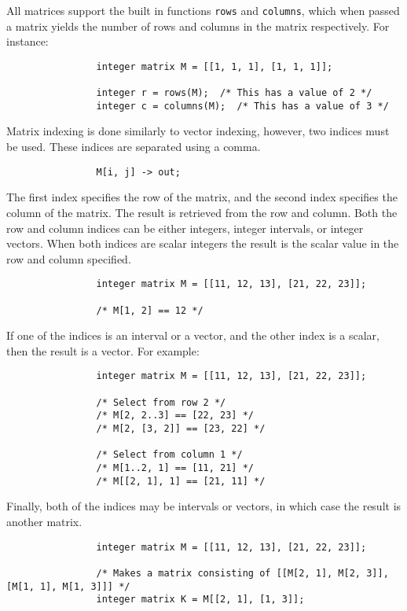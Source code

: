 \documentclass[../../gazprea.tex]{subfiles}
\begin{document}
			All matrices support the built in functions \texttt{rows} and \texttt{columns}, which when passed a matrix
			yields the number of rows and columns in the matrix respectively. For instance:

			\begin{lstlisting}
				integer matrix M = [[1, 1, 1], [1, 1, 1]];

				integer r = rows(M);  /* This has a value of 2 */
				integer c = columns(M);  /* This has a value of 3 */
			\end{lstlisting}

			Matrix indexing is done similarly to vector indexing, however, two indices must be used. These indices are
			separated using a comma.

			\begin{lstlisting}
				M[i, j] -> out;
			\end{lstlisting}

			The first index specifies the row of the matrix, and the second index specifies the column of the matrix.
			The result is retrieved from the row and column.  Both the row and column indices can be either integers,
			integer intervals, or integer vectors.  When both indices are scalar integers the result is the scalar value
			in the row and column specified.

			\begin{lstlisting}
				integer matrix M = [[11, 12, 13], [21, 22, 23]];

				/* M[1, 2] == 12 */
			\end{lstlisting}

			If one of the indices is an interval or a vector, and the other index is a scalar, then the result is a
			vector. For example:

			\begin{lstlisting}
				integer matrix M = [[11, 12, 13], [21, 22, 23]];

				/* Select from row 2 */
				/* M[2, 2..3] == [22, 23] */
				/* M[2, [3, 2]] == [23, 22] */

				/* Select from column 1 */
				/* M[1..2, 1] == [11, 21] */
				/* M[[2, 1], 1] == [21, 11] */
			\end{lstlisting}

			Finally, both of the indices may be intervals or vectors, in which case the result is another matrix.

			\begin{lstlisting}
				integer matrix M = [[11, 12, 13], [21, 22, 23]];

				/* Makes a matrix consisting of [[M[2, 1], M[2, 3]], [M[1, 1], M[1, 3]]] */
				integer matrix K = M[[2, 1], [1, 3]];
			\end{lstlisting}
\end{document}

